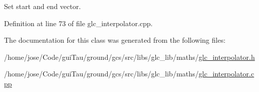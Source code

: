 Set start and end vector. 



Definition at line 73 of file glc\-\_\-interpolator.\-cpp.



The documentation for this class was generated from the following files\-:\begin{DoxyCompactItemize}
\item 
/home/jose/\-Code/gui\-Tau/ground/gcs/src/libs/glc\-\_\-lib/maths/\hyperlink{glc__interpolator_8h}{glc\-\_\-interpolator.\-h}\item 
/home/jose/\-Code/gui\-Tau/ground/gcs/src/libs/glc\-\_\-lib/maths/\hyperlink{glc__interpolator_8cpp}{glc\-\_\-interpolator.\-cpp}\end{DoxyCompactItemize}

